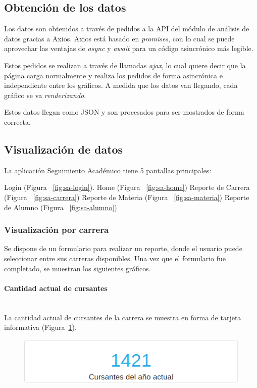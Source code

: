 \subsection{Obtención de los datos}

Los datos son obtenidos a través de pedidos a la API del módulo de análisis de datos gracias a Axios.
Axios está basado en \textit{promises}, con lo cual se puede aprovechar las ventajas de \textit{async} y \textit{await} para un código asincrónico más legible.

Estos pedidos se realizan a través de llamadas \textit{ajax}, lo cual quiere decir que la página carga normalmente y realiza los pedidos de forma asincrónica e independiente entre los gráficos. A medida que los datos van llegando, cada gráfico se va \textit{renderizando}.

Estos datos llegan como JSON y son procesados para ser mostrados de forma correcta.


\subsection{Visualización de datos}

La aplicación Seguimiento Académico tiene 5 pantallas principales:
\begin{outline}
 \1 Login (Figura ~\ref{fig:sa-login}).
 \1 Home (Figura ~\ref{fig:sa-home})
 \1 Reporte de Carrera (Figura ~\ref{fig:sa-carrera})
 \1 Reporte de Materia (Figura ~\ref{fig:sa-materia})
 \1 Reporte de Alumno (Figura ~\ref{fig:sa-alumno})
\end{outline}

\subsubsection{Visualización por carrera}

Se dispone de un formulario para realizar un reporte, donde el usuario puede seleccionar entre sus carreras disponibles. Una vez que el formulario fue completado, se muestran los siguientes gráficos.

\paragraph{Cantidad actual de cursantes} \mbox{}\\
La cantidad actual de cursantes de la carrera se muestra en forma de tarjeta informativa (Figura~\ref{fig:sa-cursantes}). 

\begin{figure}[H]
  \centering
    \includegraphics[scale=0.4]{images/seguimiento-academico/sa-cursantes.png}
  \label{fig:sa-cursantes}
\end{figure}

